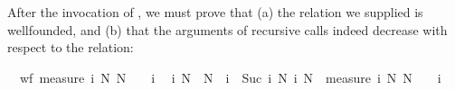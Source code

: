 \begin{isabellebody}
\begin{isamarkuptxt}
  After the invocation of , we must prove that (a)
  the relation we supplied is wellfounded, and (b) that the arguments
  of recursive calls indeed decrease with respect to the
  relation:

  \begin{isabelle}%
\ {}{}\ wf\ {}measure\ {}{}{}i{}\ N{}{}\ N\ {}\ {}\ {}\ i{}{}\isanewline
\ {}{}\ {}i\ N{}\ {}\ N\ {}\ i\ {}\ {}{}Suc\ i{}\ N{}{}\ i{}\ N{}\ {}\ measure\ {}{}{}i{}\ N{}{}\ N\ {}\ {}\ {}\ i{}%
\end{isabelle}


\end{isamarkuptxt}
\end{isabellebody}
